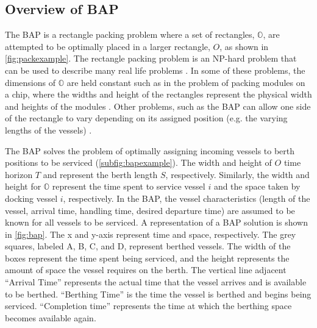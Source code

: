 \documentclass[11pt,a4paper,final]{article}
\begin{document}
\subsection{Overview of BAP}
\label{sec:overview-of-bap}
The BAP is a rectangle packing problem where a set of rectangles, \(\mathbb{O}\), are attempted to be optimally placed in
a larger rectangle, \(O\), as shown in \autoref{fig:packexample}. The rectangle packing problem is an NP-hard problem that
can be used to describe many real life problems \cite{bruin-2013-rectan-packin,murata-1995-rectan}. In some of these
problems, the dimensions of \(\mathbb{O}\) are held constant such as in the problem of packing modules on a chip, where
the widths and height of the rectangles represent the physical width and heights of the modules
\cite{murata-1995-rectan}. Other problems, such as the BAP can allow one side of the rectangle to vary depending on its
assigned position (e.g. the varying lengths of the vessels) \cite{buhrkal-2011-model-discr}.

The BAP solves the problem of optimally assigning incoming vessels to berth positions to be serviced
(\autoref{subfig:bapexample}). The width and height of \(O\) time horizon \(T\) and represent the berth length \(S\),
respectively. Similarly, the width and height for \(\mathbb{O}\) represent the time spent to service vessel \(i\) and the
space taken by docking vessel \(i\), respectively. In the BAP, the vessel characteristics (length of the vessel, arrival
time, handling time, desired departure time) are assumed to be known for all vessels to be serviced. A representation of
a BAP solution is shown in \autoref{fig:bap}. The x and y-axis represent time and space, respectively. The grey squares,
labeled A, B, C, and D, represent berthed vessels. The width of the boxes represent the time spent being serviced, and
the height represents the amount of space the vessel requires on the berth. The vertical line adjacent
 ``Arrival Time'' represents the actual
time that the vessel arrives and is available to be berthed. ``Berthing Time'' is the time the vessel is berthed and
begins being serviced. ``Completion time'' represents the time at which the berthing space becomes available again.
\end{document}
